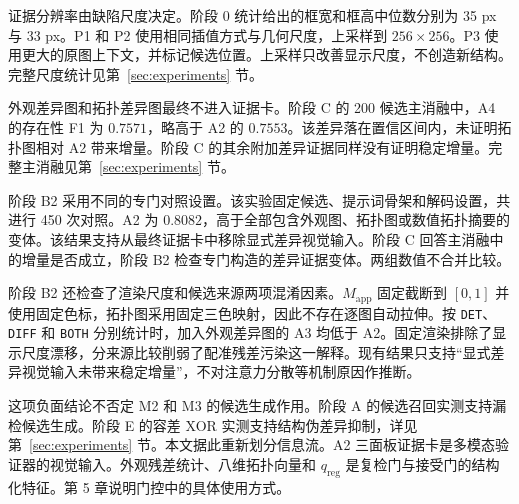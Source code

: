 证据分辨率由缺陷尺度决定。阶段 0 统计给出的框宽和框高中位数分别为 35 px 与 33 px。P1 和 P2 使用相同插值方式与几何尺度，上采样到 $256\times256$。P3 使用更大的原图上下文，并标记候选位置。上采样只改善显示尺度，不创造新结构。完整尺度统计见第~\ref{sec:experiments} 节。

外观差异图和拓扑差异图最终不进入证据卡。阶段 C 的 200 候选主消融中，A4 的存在性 F1 为 $0.7571$，略高于 A2 的 $0.7553$。该差异落在置信区间内，未证明拓扑图相对 A2 带来增量。阶段 C 的其余附加差异证据同样没有证明稳定增量。完整主消融见第~\ref{sec:experiments} 节。

阶段 B2 采用不同的专门对照设置。该实验固定候选、提示词骨架和解码设置，共进行 450 次对照。A2 为 $0.8082$，高于全部包含外观图、拓扑图或数值拓扑摘要的变体。该结果支持从最终证据卡中移除显式差异视觉输入。阶段 C 回答主消融中的增量是否成立，阶段 B2 检查专门构造的差异证据变体。两组数值不合并比较。

阶段 B2 还检查了渲染尺度和候选来源两项混淆因素。$M_{\mathrm{app}}$ 固定截断到 $[0,1]$ 并使用固定色标，拓扑图采用固定三色映射，因此不存在逐图自动拉伸。按 \texttt{DET}、\texttt{DIFF} 和 \texttt{BOTH} 分别统计时，加入外观差异图的 A3 均低于 A2。固定渲染排除了显示尺度漂移，分来源比较削弱了配准残差污染这一解释。现有结果只支持“显式差异视觉输入未带来稳定增量”，不对注意力分散等机制原因作推断。

这项负面结论不否定 M2 和 M3 的候选生成作用。阶段 A 的候选召回实测支持漏检候选生成。阶段 E 的容差 XOR 实测支持结构伪差异抑制，详见第~\ref{sec:experiments} 节。本文据此重新划分信息流。A2 三面板证据卡是多模态验证器的视觉输入。外观残差统计、八维拓扑向量和 $q_{\mathrm{reg}}$ 是复检门与接受门的结构化特征。第 5 章说明门控中的具体使用方式。
